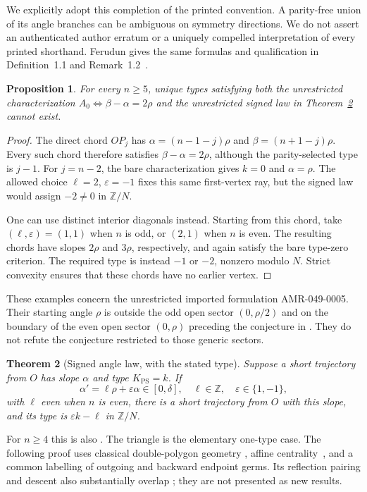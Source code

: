 \documentclass[11pt]{article}
\newtheorem{theorem}{Theorem}
\newtheorem{proposition}[theorem]{Proposition}
\newcommand{\Z}{\mathbb Z}
\newcommand{\K}{K_{\mathrm{PS}}}
\begin{document}
We explicitly adopt this completion of the printed convention.
A parity-free union of its angle branches can be ambiguous on
symmetry directions. We do not assert an authenticated author erratum
or a uniquely compelled interpretation of every printed shorthand.
Ferudun gives the same formulas and qualification in
Definition~1.1 and Remark~1.2~\cite{Ferudun}.

\begin{proposition}\label{obstruction}
For every $n\ge5$, unique types satisfying both the unrestricted
characterization $A_0\iff\beta-\alpha=2\rho$ and the unrestricted signed
law in Theorem~\ref{law} cannot exist.
\end{proposition}
\begin{proof}
The direct chord $OP_j$ has
$\alpha=(n-1-j)\rho$ and $\beta=(n+1-j)\rho$.
Every such chord therefore satisfies $\beta-\alpha=2\rho$,
although the parity-selected type is $j-1$.
For $j=n-2$, the bare characterization gives $k=0$ and
$\alpha=\rho$. The allowed choice $\ell=2$, $\varepsilon=-1$
fixes this same first-vertex ray, but the signed law would assign
$-2\ne0$ in $\Z/N$.

One can use distinct interior diagonals instead. Starting from this
chord, take $(\ell,\varepsilon)=(1,1)$ when $n$ is odd, or $(2,1)$
when $n$ is even. The resulting chords have slopes $2\rho$ and
$3\rho$, respectively, and again satisfy the bare type-zero criterion.
The required type is instead $-1$ or $-2$, nonzero modulo $N$.
Strict convexity ensures that these chords have no earlier vertex.
\end{proof}
These examples concern the unrestricted imported formulation
AMR-049-0005. Their starting angle $\rho$ is outside the odd open
sector $(0,\rho/2)$ and on the boundary of the even open sector
$(0,\rho)$ preceding the conjecture in \cite[\S2.5]{Fuchs}.
They do not refute the conjecture restricted to those generic sectors.

\begin{theorem}[Signed angle law, with the stated type]\label{law}
Suppose a short trajectory from $O$ has slope $\alpha$ and type
$\K=k$. If
\[
\alpha'=\ell\rho+\varepsilon\alpha\in[0,\delta],
\quad \ell\in\Z,\quad \varepsilon\in\{1,-1\},
\]
with $\ell$ even when $n$ is even, there is a short trajectory from $O$
with this slope, and its type is $\varepsilon k-\ell$ in $\Z/N$.
\end{theorem}
For $n\ge4$ this is also \cite[Theorem~B]{Ferudun}.
The triangle is the elementary one-type case.
The following proof uses classical double-polygon geometry
\cite{Veech,Finster}, affine centrality~\cite{BL}, and a common
labelling of outgoing and backward endpoint germs. Its reflection
pairing and descent also substantially overlap
\cite[\S\S2--3]{Ferudun}; they are not presented as new results.
\end{document}
